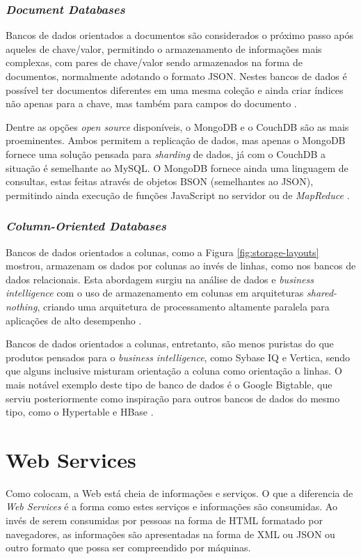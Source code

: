 \documentclass[diss]{template/setrem}
\begin{document}
\subsubsection{\textit{Document Databases}}
Bancos de dados orientados a documentos são considerados o próximo passo após aqueles de chave/valor, permitindo o armazenamento de informações mais complexas, com pares de chave/valor sendo armazenados na forma de documentos, normalmente adotando o formato JSON. Nestes bancos de dados é possível ter documentos diferentes em uma mesma coleção e ainda criar índices não apenas para a chave, mas também para campos do documento \citep{Tiwari2011, Strauch2011}.

Dentre as opções \emph{open source} disponíveis, o MongoDB e o CouchDB são as mais proeminentes. Ambos permitem a replicação de dados, mas apenas o MongoDB fornece uma solução pensada para \emph{sharding} de dados, já com o CouchDB a situação é semelhante ao MySQL. O MongoDB fornece ainda uma linguagem de consultas, estas feitas através de objetos BSON (semelhantes ao JSON), permitindo ainda execução de funções JavaScript no servidor ou de \emph{MapReduce} \citep{Strauch2011}.

\subsubsection{\textit{Column-Oriented Databases}}
Bancos de dados orientados a colunas, como a Figura \ref{fig:storage-layouts} mostrou, armazenam os dados por colunas ao invés de linhas, como nos bancos de dados relacionais. Esta abordagem surgiu na análise de dados e \emph{business intelligence} com o uso de armazenamento em colunas em arquiteturas \emph{shared-nothing}, criando uma arquitetura de processamento altamente paralela para aplicações de alto desempenho \citep{Strauch2011}.

Bancos de dados orientados a colunas, entretanto, são menos puristas do que produtos pensados para o \emph{business intelligence}, como Sybase IQ e Vertica, sendo que alguns inclusive misturam orientação a coluna como orientação a linhas. O mais notável exemplo deste tipo de banco de dados é o Google Bigtable, que serviu posteriormente como inspiração para outros bancos de dados do mesmo tipo, como o Hypertable e HBase \citep{Strauch2011}.

\section{Web Services}
\label{sec:webservices-api}
Como \citet{Richardson2007} colocam, a Web está cheia de informações e serviços. O que a diferencia de \emph{Web Services} é a forma como estes serviços e informações são consumidas. Ao invés de serem consumidas por pessoas na forma de HTML formatado por navegadores, as informações são apresentadas na forma de XML ou JSON ou outro formato que possa ser compreendido por máquinas.
\end{document}
